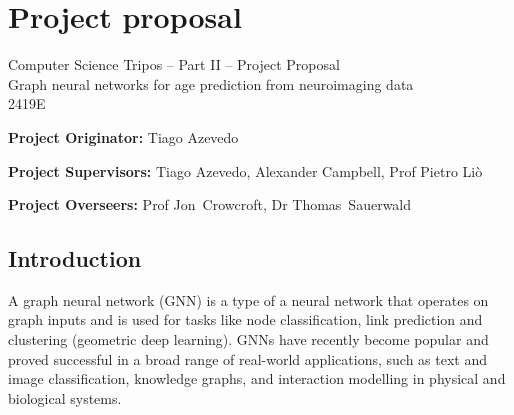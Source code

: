 
% 
\chapter{Project proposal}
\label{chapter:project-proposal}

\begin{center}
\Large
Computer Science Tripos -- Part II -- Project Proposal\\[4mm]
\LARGE
Graph neural networks for age prediction from neuroimaging data \\[4mm]

\large
2419E

\end{center}

\vspace{5mm}
\textbf{Project Originator:} Tiago Azevedo

\textbf{Project Supervisors:} Tiago Azevedo, Alexander Campbell, Prof Pietro Liò

\textbf{Project Overseers:} Prof Jon~Crowcroft, Dr Thomas~Sauerwald


\section*{Introduction}


A graph neural network (GNN) is a type of a neural network that operates on graph inputs and is used for tasks like node classification, link prediction and clustering (geometric deep learning). GNNs have recently become popular and proved successful in a broad range of real-world applications, such as text and image classification, knowledge graphs, and interaction modelling in physical and biological systems. \cite{zhou2018gnn}

